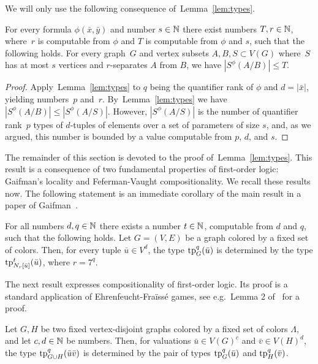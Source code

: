 We will only use the following consequence of~Lemma~\ref{lem:types}.

\begin{corollary}\label{cor:bound}
For every formula $\phi(\bar x,\bar y)$ 
and number $s\in \mathbb{N}$
there exist numbers $T,r\in \mathbb{N}$,
where~$r$ is computable from $\phi$ and $T$ is computable from $\phi$ and $s$,
  such that the following holds. For every graph~$G$ and vertex subsets $A,B,S\subset V(G)$ 
  where~$S$ has at most $s$ vertices and $r$-separates $A$ from $B$, we have $|S^\phi(A/B)|\le T$.
\end{corollary}
\begin{proof}
Apply~Lemma~\ref{lem:types} to $q$ being the quantifier rank of $\phi$ and $d=|\bar x|$, yielding numbers~$p$ and~$r$.
By~Lemma~\ref{lem:types} we have $|S^\phi(A/B)|\leq |S^\phi(A/S)|$.
However, $|S^\phi(A/S)|$ is the number of quantifier rank~$p$ types of $d$-tuples of elements over a set of parameters of size $s$, and, as we argued, this number is bounded by a value computable from $p$, $d$, and $s$.
\end{proof}

The remainder of this section is devoted to the proof of~Lemma~\ref{lem:types}.
This result is a consequence of two fundamental properties of first-order logic:
Gaifman's locality and Feferman-Vaught compositionality. We recall these results now.
The following statement is an immediate corollary of the main result in a paper of Gaifman~\cite{gaifman1982local}.

\begin{lemma}\label{lem:gaif}
  For all numbers $d,q\in \mathbb{N}$ there exists a number $t\in \mathbb{N}$, computable from $d$ and $q$, such that the following holds.
  Let $G=(V,E)$ be a graph colored by a fixed set of 
  colors. %
  Then, for every tuple $\bar u\in V^d$, the type  $\mathrm{tp}^q_G(\bar u)$ is determined by the type $\mathrm{tp}^{t}_{N_r[\bar u]}(\bar u)$, where $r=7^q$.
\end{lemma}

The next result expresses compositionality of first-order logic. Its proof is a standard application of Ehrenfeucht-Fra\"iss\'e games, see e.g.\ Lemma 2
of~\cite{blumensath2012locality} for a proof.

\begin{lemma}\label{lem:fv}
  Let $G,H$ be two fixed vertex-disjoint graphs colored by a fixed set of colors $\Lambda$, and let 
  $c,d\in\mathbb{N}$  be numbers.
  Then, for valuations $\bar u\in V(G)^{c}$ and $\bar v\in V(H)^{d}$, 
 the type 
 $\mathrm{tp}^q_{G\cup H}(\bar u\bar v)$
 is determined by the pair of types $\mathrm{tp}^q_G(\bar u)$ and $\mathrm{tp}^q_H(\bar v)$.
\end{lemma}

